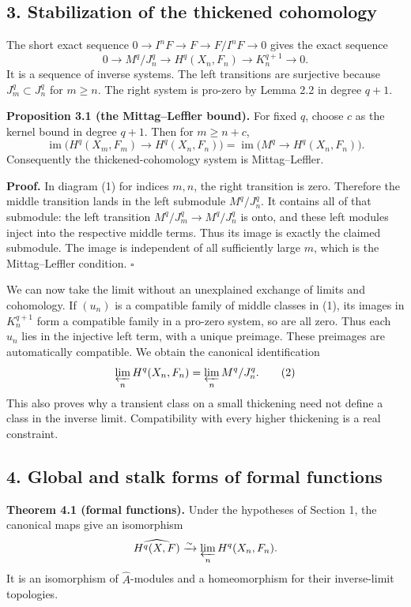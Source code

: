 \documentclass[11pt]{article}
\begin{document}
\subsection{3. Stabilization of the thickened
cohomology}\label{stabilization-of-the-thickened-cohomology}

The short exact sequence \(0\to I^nF\to F\to F/I^nF\to0\) gives the
exact sequence \[
0\to M^q/J_n^q\longrightarrow H^q(X_n,F_n)\longrightarrow K_n^{q+1}\to0.
\tag{1}
\] It is a sequence of inverse systems. The left transitions are
surjective because \(J_m^q\subset J_n^q\) for \(m\geq n\). The right
system is pro-zero by Lemma 2.2 in degree \(q+1\).

\textbf{Proposition 3.1 (the Mittag--Leffler bound).} For fixed \(q\),
choose \(c\) as the kernel bound in degree \(q+1\). Then for
\(m\geq n+c\), \[
\operatorname{im}\bigl(H^q(X_m,F_m)\to H^q(X_n,F_n)\bigr)
=\operatorname{im}\bigl(M^q\to H^q(X_n,F_n)\bigr).
\] Consequently the thickened-cohomology system is Mittag--Leffler.

\textbf{Proof.} In diagram (1) for indices \(m,n\), the right transition
is zero. Therefore the middle transition lands in the left submodule
\(M^q/J_n^q\). It contains all of that submodule: the left transition
\(M^q/J_m^q\to M^q/J_n^q\) is onto, and these left modules inject into
the respective middle terms. Thus its image is exactly the claimed
submodule. The image is independent of all sufficiently large \(m\),
which is the Mittag--Leffler condition. \(\square\)

We can now take the limit without an unexplained exchange of limits and
cohomology. If \((u_n)\) is a compatible family of middle classes in
(1), its images in \(K_n^{q+1}\) form a compatible family in a pro-zero
system, so are all zero. Thus each \(u_n\) lies in the injective left
term, with a unique preimage. These preimages are automatically
compatible. We obtain the canonical identification \[
\varprojlim_n H^q(X_n,F_n)=\varprojlim_n M^q/J_n^q.
\tag{2}
\] This also proves why a transient class on a small thickening need not
define a class in the inverse limit. Compatibility with every higher
thickening is a real constraint.

\subsection{4. Global and stalk forms of formal
functions}\label{global-and-stalk-forms-of-formal-functions}

\textbf{Theorem 4.1 (formal functions).} Under the hypotheses of Section
1, the canonical maps give an isomorphism \[
\widehat{H^q(X,F)}\xrightarrow{\sim}\varprojlim_n H^q(X_n,F_n).
\] It is an isomorphism of \(\widehat A\)-modules and a homeomorphism
for their inverse-limit topologies.
\end{document}
